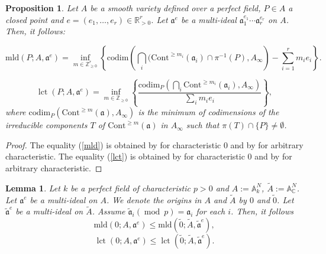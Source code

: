 \documentclass[a4paper]{amsart}
\def\AA{{\mathbb{A}}}
\def\RR{{\mathbb{R}}}
\def\CC{{\mathbb{C}}}
\def\ZZ{{\mathbb{Z}}}
\renewcommand{\a}{{\mathfrak{a}}}
\newcommand{\mld}{{\mathrm{mld}}}
\newcommand{\cont}{{\mathrm{Cont}}}
\newcommand{\codim}{{\mathrm{codim}}}
\newcommand{\lct}{{\operatorname{lct}}}
\newcommand{\taa}{{\widetilde{\mathfrak a}}}
\newcommand{\wa}{{\widetilde{A}}}
\newcommand{\tze}{{\tilde 0}}
\renewcommand{\mod}{{\operatorname{mod}\ }}
\newtheorem{prop}[thm]{Proposition}
\newtheorem{lem}[thm]{Lemma}
\theoremstyle{definition}
\begin{document}
\begin{prop}
\label{formula}  Let $A$ be a smooth variety  defined over a perfect field,
   $P\in A$ a  closed  point and $e=(e_1,\ldots, e_r)
  \in \RR_{>0}^r$. 
%
  Let $\a^e$ be a multi-ideal $\a_1^{e_1}\cdots \a_r^{e_r}$ on $A$. 
  Then, it follows:

\begin{equation}\label{mld}
\mld(P; A, \a^e) 
=\inf_{m\in \ZZ_{\geq0}^r}\left\{\codim\left(\bigcap_i (\cont^{\geq m_i}(\a_i)\cap \pi^{-1}(P), A_\infty\right)-\sum_{i=1}^r m_ie_i
 \right\}.
 \end{equation}
 
 \begin{equation}\label{lct}
 \lct(P; A, \a^e)=\inf_{m\in \ZZ_{\geq0}}\left\{ \frac{\codim_P\left(\bigcap_i\cont^{\geq m_i}(\a_i), A_\infty\right)}{\sum_i m_ie_i}\right\},
 \end{equation}
 where $\codim_P(\cont^{\geq m}(\a), A_\infty)$ is  the minimum of  codimensions of  the irreducible components $T$ of 
 $\cont^{\geq m}(\a)$ in $ A_\infty$
 such that $\pi(T) \cap \{P\}\neq \emptyset$.

 
\end{prop}   
\begin{proof}
The equality (\ref{mld}) is obtained by
\cite{EM} for characteristic $0$ and by  \cite{ir2} for arbitrary characteristic.
The equality (\ref{lct}) is obtained by \cite{must} for characteristic $0$ and by \cite{zhu} for arbitrary characteristic.
\end{proof}  
     

\begin{lem}\label{inequality of mld}
     Let $k$ be a perfect field of characteristic $p>0$ and $A:=\AA_k^N$, $\wa:=\AA_\CC^N$. 
     Let  $\a^e$  be a multi-ideal on $A$.
     We denote the origins in $A$ and $\wa$ by $0$ and $\tze$.
     Let $\taa^e$  be a multi-ideal  on $\wa$.
     Assume $\taa_i (\mod p)=\a_i$ for each $i$.
     Then, it follows
\begin{equation}\label{ineq-of-ideals}
\mld(0; A, \a^e)\leq \mld(\tze; \wa, \taa^e),
\end{equation}
\begin{equation}\label{ineq-of-lct}
\lct(0; A, \a^e)\leq \lct(\tze; \wa, \taa^e).
\end{equation}     
 


\end{lem}
\end{document}
